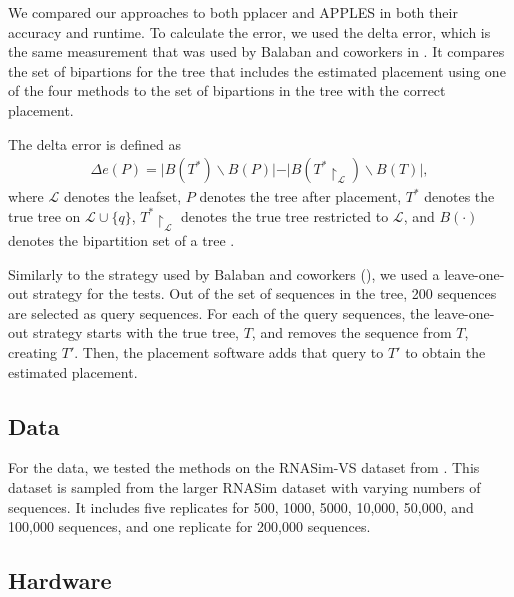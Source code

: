\documentclass[10pt]{article}
\begin{document}
We compared our approaches to both pplacer and APPLES in both their accuracy and runtime.
To calculate the error, we used the delta error, which is the same measurement that was used by
Balaban and coworkers in \cite{balaban_apples_2020}.
It compares the set of bipartions for the tree that includes the estimated placement using one of the four methods to the set of bipartions in the tree with the correct placement.

The delta error is defined as
\begin{align*}
\Delta e(P) = \vert B(T^*) \backslash B(P) \vert - \vert B(T^* \upharpoonright_{\mathcal L}) \backslash B(T)\vert,
\end{align*}
where $\mathcal L$ denotes the leafset, \(P\) denotes the tree after placement, $T^*$ denotes the true tree on $\mathcal L \cup \{q\}$, $T^* \upharpoonright_{\mathcal L}$ denotes the true tree restricted to $\mathcal L$, and $B(\cdot)$ denotes the bipartition set of a tree \cite{balaban_apples_2020}.

Similarly to the strategy used by Balaban and coworkers (\cite{balaban_apples_2020}), we used a leave-one-out strategy for the tests.
Out of the set of sequences in the tree, 200 sequences are selected as query sequences.
For each of the query sequences, the leave-one-out strategy starts with the true tree, \(T\), and removes the sequence from \(T\), creating \(T'\).
Then, the placement software adds that query to \(T'\) to obtain the estimated placement.

\subsection{Data}

For the data, we tested the methods on the RNASim-VS dataset from \cite{balaban_apples_2020}. This dataset is sampled from the larger RNASim dataset with varying numbers of sequences. It includes five replicates for 500, 1000, 5000, 10,000, 50,000, and 100,000 sequences, and one replicate for 200,000 sequences.


\subsection{Hardware}
\end{document}
